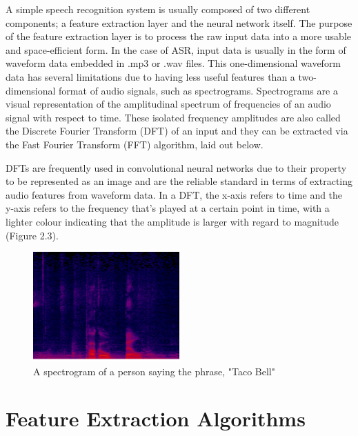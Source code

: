 A simple speech recognition system is usually composed of two different components; a feature extraction layer and the neural network itself. The purpose of the feature extraction layer is to process the raw input data into a more usable and space-efficient form. In the case of ASR, input data is usually in the form of waveform data embedded in .mp3 or .wav files. This one-dimensional waveform data has several limitations due to having less useful features than a two-dimensional format of audio signals, such as spectrograms. Spectrograms are a visual representation of the amplitudinal spectrum of frequencies of an audio signal with respect to time. These isolated frequency amplitudes are also called the Discrete Fourier Transform (DFT) of an input and they can be extracted via the Fast Fourier Transform (FFT) algorithm, laid out below.
\newline\par
DFTs are frequently used in convolutional neural networks due to their property to be represented as an image and are the reliable standard in terms of extracting audio features from waveform data. In a DFT, the x-axis refers to time and the y-axis refers to the frequency that’s played at a certain point in time, with a lighter colour indicating that the amplitude is larger with regard to magnitude (Figure 2.3).

\begin{figure}[th]
    \centering
    \includegraphics[width=0.5\textwidth]{Figures/tacobell.png}
    \decoRule
    \caption[Spectrogram]{A spectrogram of a person saying the phrase, "Taco Bell"}
    \label{fig:Spectrogram}
\end{figure}

\section{Feature Extraction Algorithms}

